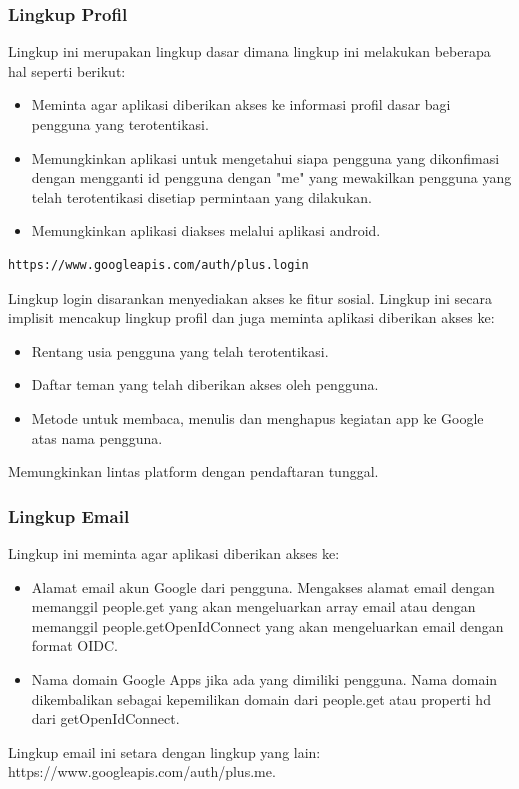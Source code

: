 \subsubsection{Lingkup Profil}
Lingkup ini merupakan lingkup dasar dimana lingkup ini melakukan beberapa hal seperti berikut:
\begin{itemize}
\item
Meminta agar aplikasi diberikan akses ke informasi profil dasar bagi pengguna yang terotentikasi.
\item
Memungkinkan aplikasi untuk mengetahui siapa pengguna yang dikonfimasi dengan mengganti id pengguna dengan "me" yang mewakilkan pengguna yang telah terotentikasi disetiap permintaan yang dilakukan.
\item
Memungkinkan aplikasi diakses melalui aplikasi android.
\end{itemize}
\begin{lstlisting}
https://www.googleapis.com/auth/plus.login
\end{lstlisting}
Lingkup login disarankan menyediakan akses ke fitur sosial. Lingkup ini secara implisit mencakup lingkup profil dan juga meminta aplikasi diberikan akses ke:
\begin{itemize}
\item
Rentang usia pengguna yang telah terotentikasi.
\item
Daftar teman yang telah diberikan akses oleh pengguna.
\item
Metode untuk membaca, menulis dan menghapus kegiatan app ke Google atas nama pengguna.
\end{itemize}
Memungkinkan lintas platform dengan pendaftaran tunggal.

\subsubsection{Lingkup Email}
Lingkup ini meminta agar aplikasi diberikan akses ke:
\begin{itemize}
\item
Alamat email akun Google dari pengguna. Mengakses alamat email dengan memanggil people.get yang akan mengeluarkan array email atau dengan memanggil people.getOpenIdConnect yang akan mengeluarkan email dengan format OIDC.
\item
Nama domain Google Apps jika ada yang dimiliki pengguna. Nama domain dikembalikan sebagai kepemilikan domain dari people.get atau properti hd dari getOpenIdConnect.
\end{itemize}
Lingkup email ini setara dengan lingkup yang lain:
https://www.googleapis.com/auth/plus.me.

